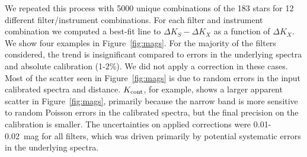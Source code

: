 \documentclass[twocolumn]{aastex62}
\begin{document}
We repeated this process with 5000 unique combinations of the 183 stars for 12 different filter/instrument combinations. For each filter and instrument combination we computed a best-fit line to $\Delta K_S -\Delta K_X$ as a function of $\Delta K_X$. We show four examples in Figure~\ref{fig:mags}. For the majority of the filters considered, the trend is insignificant compared to errors in the underlying spectra and absolute calibration (1-2\%). We did not apply a correction in these cases. Most of the scatter seen in Figure~\ref{fig:mags} is due to random errors in the input calibrated spectra and distance. $K_{\rm{cont}}$, for example, shows a larger apparent scatter in Figure~\ref{fig:mags}, primarily because the narrow band is more sensitive to random Poisson errors in the calibrated spectra, but the final precision on the calibration is smaller. The uncertainties on applied corrections were 0.01-0.02~mag for all filters, which was driven primarily by potential systematic errors in the underlying spectra. 
\end{document}
